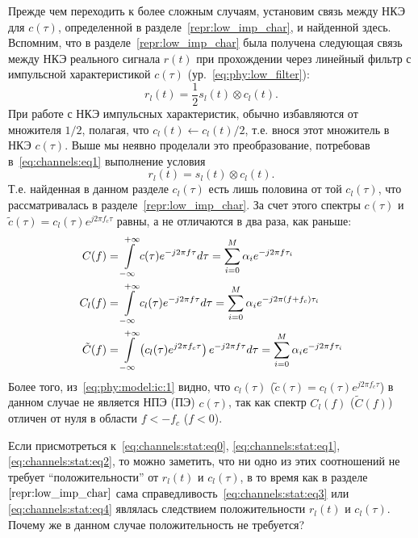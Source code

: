 \documentclass{book}
\numberwithin{theorem}{chapter}
\numberwithin{statement}{chapter}
\numberwithin{lemma}{chapter}
\theoremstyle{definition}
\numberwithin{task}{chapter}
\theoremstyle{remark}
\numberwithin{example}{chapter}
\theoremstyle{definition}
\numberwithin{definition}{chapter}
\theoremstyle{remark}
\theoremstyle{remark}
\numberwithin{lyrics}{section}
\begin{document}
Прежде чем переходить к более сложным случаям, установим связь между НКЭ для $c(\tau)$, определенной в разделе~\ref{repr:low_imp_char}, и найденной здесь. Вспомним, что в разделе~\ref{repr:low_imp_char} была получена следующая связь между НКЭ реального сигнала $r(t)$ при прохождении через линейный фильтр с импульсной характеристикой $c(\tau)$ (ур.~\eqref{eq:phy:low_filter}):
\begin{equation}
\label{eq:channels:stat:eq3}
r_l(t) = \frac{1}{2} s_l(t) \otimes c_l(t).
\end{equation}
При работе с НКЭ импульсных характеристик, обычно избавляются от множителя $1/2$, полагая, что $c_l(t) \leftarrow c_l(t) / 2$, т.е. внося этот множитель в НКЭ $c(\tau)$. Выше мы неявно проделали это преобразование, потребовав в~\eqref{eq:channels:eq1} выполнение условия
\begin{equation}
\label{eq:channels:stat:eq4}
r_l(t) = s_l(t) \otimes c_l(t).
\end{equation}
Т.е. найденная в данном разделе $c_l(\tau)$ есть лишь половина от той $c_l(\tau)$, что рассматривалась в разделе~\ref{repr:low_imp_char}. За счет этого спектры $c(\tau)$ и $\tilde{c}(\tau) = c_l(\tau) e^{j2\pi f_c \tau}$ равны, а не отличаются в два раза, как раньше:
\begin{align}
C(f) &= \int\limits_{-\infty}^{+\infty} c(\tau) e^{-j2\pi f \tau} d\tau = \sum\limits_{i=0}^M \alpha_i e^{-j 2 \pi f \tau_i} \\
C_l(f) &= \int\limits_{-\infty}^{+\infty} c_l(\tau) e^{-j2\pi f \tau} d\tau = \sum\limits_{i=0}^M \alpha_i e^{-j 2 \pi (f + f_c) \tau_i} \\
\tilde{C}(f) &= \int\limits_{-\infty}^{+\infty} \left(c_l(\tau) e^{j 2\pi f_c \tau} \right) e^{-j 2\pi f \tau} d\tau = \sum\limits_{i=0}^M \alpha_i e^{-j 2\pi f \tau_i} \label{eq:phy:model:ic:1}
\end{align} 
Более того, из~\eqref{eq:phy:model:ic:1} видно, что $c_l(\tau)$ ($\tilde{c}(\tau) = c_l(\tau) e^{j2\pi f_c \tau}$) в данном случае не является НПЭ (ПЭ) $c(\tau)$, так как спектр $C_l(f)$ ($\tilde{C}(f)$) отличен от нуля в области $f < -f_c$ ($f < 0$).

Если присмотреться к~\eqref{eq:channels:stat:eq0}, \eqref{eq:channels:stat:eq1}, \eqref{eq:channels:stat:eq2}, то можно заметить, что ни одно из этих соотношений не требует ``положительности'' от $r_l(t)$ и $c_l(\tau)$, в то время как в разделе~$\ref{repr:low_imp_char}$ сама справедливость~\eqref{eq:channels:stat:eq3} или \eqref{eq:channels:stat:eq4} являлась следствием положительности $r_l(t)$ и $c_l(\tau)$. Почему же в данном случае положительность не требуется?
\end{document}
